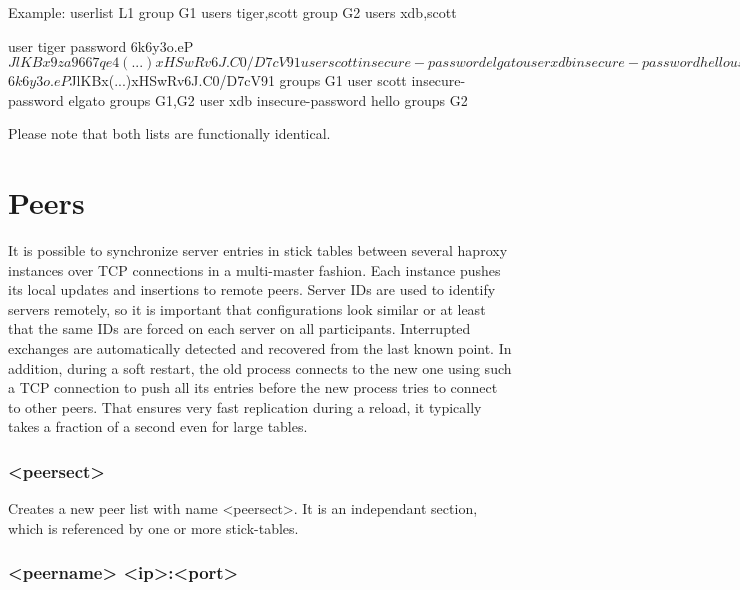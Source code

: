 \begin{example}{Example:}
        userlist L1
          group G1 users tiger,scott
          group G2 users xdb,scott

          user tiger password $6$k6y3o.eP$JlKBx9za9667qe4(...)xHSwRv6J.C0/D7cV91
          user scott insecure-password elgato
          user xdb insecure-password hello

        userlist L2
          group G1
          group G2

          user tiger password $6$k6y3o.eP$JlKBx(...)xHSwRv6J.C0/D7cV91 groups G1
          user scott insecure-password elgato groups G1,G2
          user xdb insecure-password hello groups G2
\end{example}

  Please note that both lists are functionally identical.

\section{Peers}
\label{sec:peers}

It is possible to synchronize server entries in stick tables between several
haproxy instances over TCP connections in a multi-master fashion. Each instance
pushes its local updates and insertions to remote peers. Server IDs are used to
identify servers remotely, so it is important that configurations look similar
or at least that the same IDs are forced on each server on all participants.
Interrupted exchanges are automatically detected and recovered from the last
known point. In addition, during a soft restart, the old process connects to
the new one using such a TCP connection to push all its entries before the new
process tries to connect to other peers. That ensures very fast replication
during a reload, it typically takes a fraction of a second even for large
tables.

\subsubsection[peers]{ <peersect>}

Creates a new peer list with name <peersect>. It is an independant section,
which is referenced by one or more stick-tables.

\subsubsection[peer]{ <peername> <ip>:<port>}

